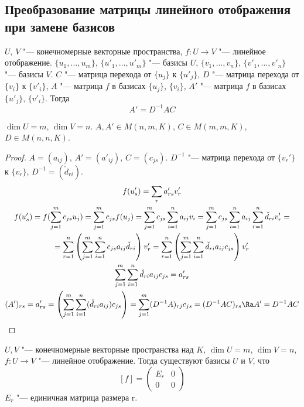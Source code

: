 \subsection{Преобразование матрицы линейного отображения при замене базисов}

\begin{theorem}
	$U$, $V$ "--- конечномерные векторные пространства, $f\colon U \to V$ "--- линейное отображение.
	$\{u_1, \dots, u_m\}$, $\{u'_1, \dots, u'_m\}$  "--- базисы $U$,
	$\{v_1, \dots, v_n\}$, $\{v'_1, \dots, v'_n\}$  "--- базисы $V$.
	$C$ "--- матрица перехода от $\{u_j\}$ к $\{u'_j\}$,
	$D$ "--- матрица перехода от $\{v_i\}$ к $\{v'_i\}$,
	$A$ "--- матрица $f$ в базисах $\{u_j\}$, $\{v_i\}$,
	$A'$ "--- матрица $f$ в базисах $\{u'_j\}$, $\{v'_i\}$.
	Тогда
	\[ A' = D^{-1}AC \]
\end{theorem}
\begin{Rem}
	$\dim U = m$, $\dim V = n$.
	$A, A' \in M(n, m, K)$,
	$C \in M(m, m, K)$,
	$D \in M(n, n, K)$.
\end{Rem}
\begin{proof}
	$A = (a_{ij})$, $A'=(a'_{ij})$, $C = (c_{js})$.
	$D^{-1}$ "--- матрица перехода от $\{v_r'\}$ к $\{v_r\}$, $D^{-1}=(\check d_{ri})$.
	\begin{gather*}
		f(u'_s) = \sum_ra'_{rs}v'_r \\
		f(u'_s) = f(\sum_{j=1}^m c_{js}u_j) = \sum_{j=1}^m c_{js}f(u_j)
			= \sum_{j=1}^m c_{js} \sum_{i=1}^n a_{ij}v_i = \sum_{j=1}^m c_{js}\sum_{i=1}^n a_{ij} \sum_{r=1}^n\check d_{ri} v_r' = \\
		= \sum_{r=1}^n \left(\sum_{j=1}^m \sum_{i=1}^n c_{js}a_{ij}\check d_{ri}\right) v_r'
			= \sum_{r=1}^n \left(\sum_{j=1}^m \sum_{i=1}^n \check d_{ri}a_{ij}c_{js}\right)v_r' \\
		\sum_{j=1}^m \sum_{i=1}^n \check d_{ri}a_{ij} c_{js} = a'_{rs} \\
		(A')_{rs} = a'_{rs} = \left(\sum_{j=1}^m \sum_{i=1}^n (\check d_{ri}a_{ij})c_{js}\right)
			= \sum_{j = 1}^m(D^{-1}A)_{rj}c_{js} = (D^{-1}AC)_{rs} \Ra A' = D^{-1}AC
	\end{gather*}
\end{proof}

\begin{theorem}
	$U, V$ "--- конечномерные векторные пространства над $K$, $\dim U = m$, $\dim V = n$,
	$f\colon U \to V$ "--- линейное отображение.
	Тогда существуют базисы $U$ и $V$, что
	\[
		[f] = \begin{pmatrix}
			E_r & 0 \\
			0   & 0
		\end{pmatrix}
	\]
	$E_r$ "--- единичная матрица размера r.
\end{theorem}

